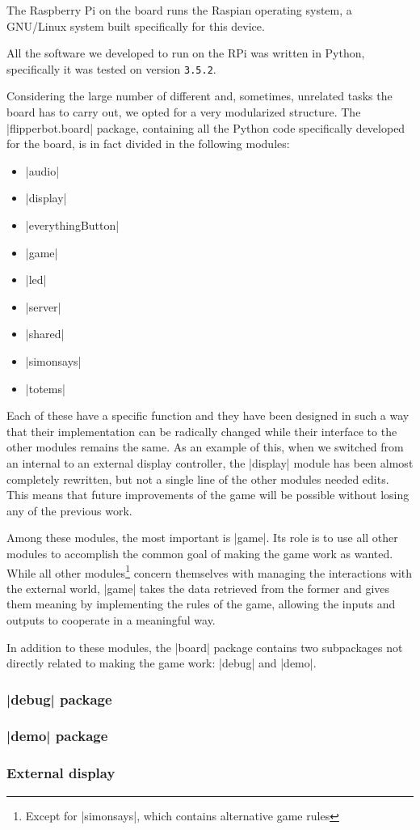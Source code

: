 The Raspberry Pi on the board runs the Raspian operating system, a GNU/Linux
system built specifically for this device.

All the software we developed to run on the RPi was written in Python,
specifically it was tested on version \Verb|3.5.2|.

\beforelist* Considering the large number of different and, sometimes, unrelated
tasks the board has to carry out, we opted for a very modularized structure.
The \Code|flipperbot.board| package, containing all the Python code specifically
developed for the board, is in fact divided in the following modules:
\begin{multicols}{2}
\begin{itemize}
  \item \Code|audio|
  \item \Code|display|
  \item \Code|everythingButton|
  \item \Code|game|
  \item \Code|led|
  \item \Code|server|
  \item \Code|shared|
  \item \Code|simonsays|
  \item \Code|totems|
\end{itemize}
\end{multicols}
\afterlist
Each of these have a specific function and they have been designed in such a way
that their implementation can be radically changed while their interface to the
other modules remains the same.
As an example of this, when we switched from an internal to an external display controller, the \Code|display| module has been almost completely rewritten, but
not a single line of the other modules needed edits.
This means that future improvements of the game will be possible without losing
any of the previous work.

Among these modules, the most important is \Code|game|.
Its role is to use all other modules to accomplish the common goal of making the
game work as wanted.
While all other modules\footnote{Except for \Code|simonsays|, which contains alternative game rules} concern themselves with managing the interactions with
the external world, \Code|game| takes the data retrieved from the former and
gives them meaning by implementing the rules of the game, allowing the inputs
and outputs to cooperate in a meaningful way.

In addition to these modules, the \Code|board| package contains two subpackages
not directly related to making the game work: \Code|debug| and \Code|demo|. 

\subsubsection[\code{demo} package]{\Code|debug| package}


\subsubsection[\code{demo} package]{\Code|demo| package}


\subsubsection{External display}


